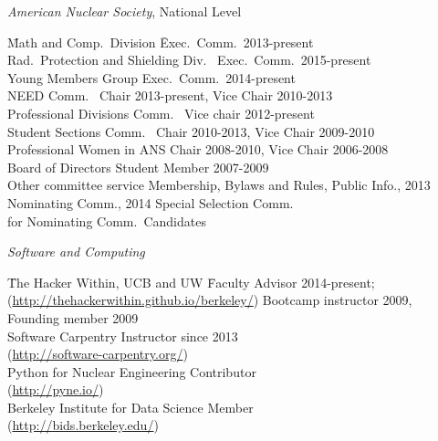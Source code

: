 \textit{American Nuclear Society}, National Level
\begin{tabbing}
\hspace*{2 em}\= Math and Comp.\ Division \hspace*{6em} \= Exec.\ Comm.\ 2013-present \\
%
\> Rad.\ Protection and Shielding Div.\ \> Exec.\ Comm.\ 2015-present\\
%
\> Young Members Group \> Exec.\ Comm.\ 2014-present\\
%
\> NEED Comm.\ \> Chair 2013-present, Vice Chair 2010-2013\\
%
\> Professional Divisions Comm.\ \>	Vice chair 2012-present \\
%
\> Student Sections Comm.\ \> Chair 2010-2013, Vice Chair 2009-2010\\
%
\> Professional Women in ANS	\> Chair 2008-2010, Vice Chair 2006-2008\\	
%
\> Board of Directors \>	Student Member 2007-2009\\
%
\> Other committee service \>	Membership, Bylaws and Rules, Public Info., 2013 \\ \> \> Nominating Comm., 2014 Special Selection Comm.\ \\ \> \> for Nominating Comm.\ Candidates
\end{tabbing}

\vspace*{-.5em}
\textit{Software and Computing}
\begin{tabbing}
\hspace*{2 em}\= The Hacker Within, UCB and UW \hspace*{6em} \= Faculty Advisor 2014-present; \\ 
\>\hspace*{1 em}(\href{http://thehackerwithin.github.io/berkeley/}{http://thehackerwithin.github.io/berkeley/}) \>Bootcamp instructor 2009, Founding member 2009\\
%
\> Software Carpentry  \> Instructor since 2013\\
\> \hspace*{1 em}(\href{http://software-carpentry.org/}{http://software-carpentry.org/})\\
%
\> Python for Nuclear Engineering  \> Contributor \\
\> \hspace*{1 em}(\href{http://pyne.io/}{http://pyne.io/})\\
%
\> Berkeley Institute for Data Science \> Member \\
\> \hspace*{1 em}(\href{http://bids.berkeley.edu/}{http://bids.berkeley.edu/})
\end{tabbing}

